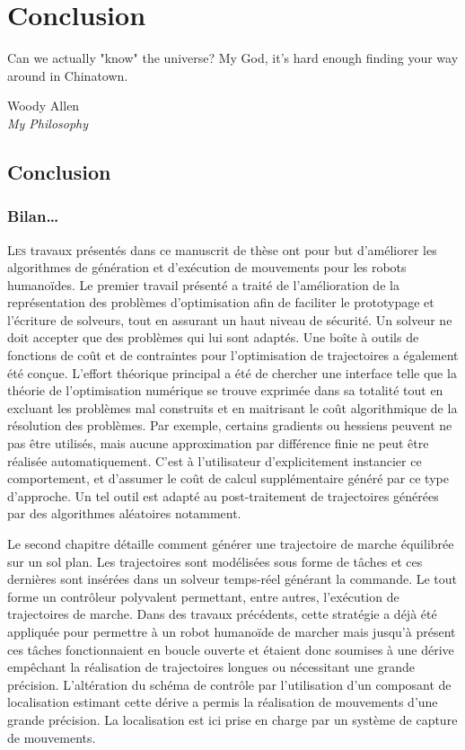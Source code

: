 \chapter{Conclusion}
\label{chap:conclusion}

\epigraph{\foreignlanguage{USenglish}{Can we actually "know" the
    universe? My God, it's hard enough finding your way around in
    Chinatown.}}{Woody Allen\\\emph{My Philosophy}}
\clearpage

\section{Conclusion}
\subsection{Bilan\ldots}

\lettrine[lines=2, lraise=0.1, nindent=0em, slope=-.5em]%
{L}{es} travaux présentés dans ce manuscrit de thèse ont pour but
d'améliorer les algorithmes de génération et d'exécution de mouvements
pour les robots humanoïdes. Le premier travail présenté a traité de
l'amélioration de la représentation des problèmes d'optimisation afin
de faciliter le prototypage et l'écriture de solveurs, tout en
assurant un haut niveau de sécurité. Un solveur ne doit accepter que
des problèmes qui lui sont adaptés. Une boîte à outils de fonctions de
coût et de contraintes pour l'optimisation de trajectoires a également
été conçue. L'effort théorique principal a été de chercher une
interface telle que la théorie de l'optimisation numérique se trouve
exprimée dans sa totalité tout en excluant les problèmes mal construits
et en maitrisant le coût algorithmique de la résolution des
problèmes. Par exemple, certains gradients ou hessiens peuvent ne pas
être utilisés, mais aucune approximation par différence finie ne peut
être réalisée automatiquement. C'est à l'utilisateur d'explicitement
instancier ce comportement, et d'assumer le coût de calcul
supplémentaire généré par ce type d'approche. Un tel outil est adapté
au post-traitement de trajectoires générées par des algorithmes
aléatoires notamment.


Le second chapitre détaille comment générer une trajectoire de marche
équilibrée sur un sol plan. Les trajectoires sont modélisées sous
forme de tâches et ces dernières sont insérées dans un solveur
temps-réel générant la commande. Le tout forme un contrôleur
polyvalent permettant, entre autres, l'exécution de trajectoires de
marche. Dans des travaux précédents, cette stratégie a déjà été
appliquée pour permettre à un robot humanoïde de marcher mais jusqu'à
présent ces tâches fonctionnaient en boucle ouverte et étaient donc
soumises à une dérive empêchant la réalisation de trajectoires longues
ou nécessitant une grande précision. L'altération du schéma de
contrôle par l'utilisation d'un composant de localisation estimant
cette dérive a permis la réalisation de mouvements d'une grande
précision. La localisation est ici prise en charge par un système de
capture de mouvements.


